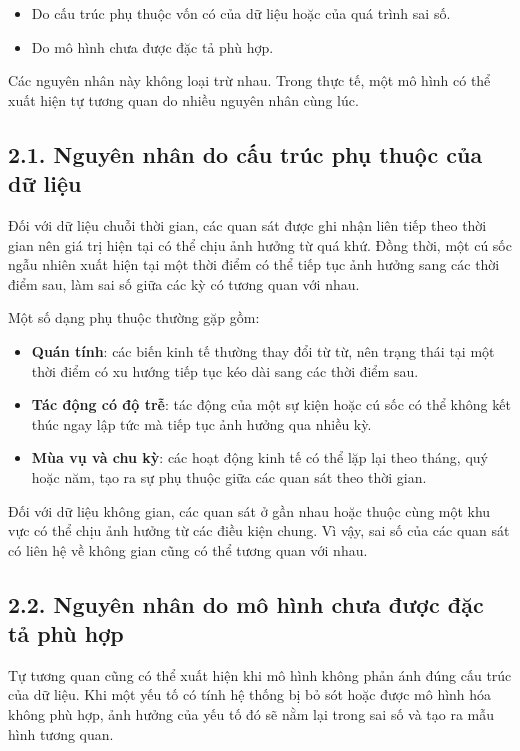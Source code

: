 \documentclass[12pt,a4paper]{article}
\begin{document}
\begin{itemize}
    \item Do cấu trúc phụ thuộc vốn có của dữ liệu hoặc của quá trình sai số.
    \item Do mô hình chưa được đặc tả phù hợp.
\end{itemize}

Các nguyên nhân này không loại trừ nhau. Trong thực tế, một mô hình có thể xuất hiện tự tương quan do nhiều nguyên nhân cùng lúc.

\subsection{2.1. Nguyên nhân do cấu trúc phụ thuộc của dữ liệu}

Đối với dữ liệu chuỗi thời gian, các quan sát được ghi nhận liên tiếp theo thời gian nên giá trị hiện tại có thể chịu ảnh hưởng từ quá khứ. Đồng thời, một cú sốc ngẫu nhiên xuất hiện tại một thời điểm có thể tiếp tục ảnh hưởng sang các thời điểm sau, làm sai số giữa các kỳ có tương quan với nhau.

Một số dạng phụ thuộc thường gặp gồm:

\begin{itemize}
    \item \textbf{Quán tính}: các biến kinh tế thường thay đổi từ từ, nên trạng thái tại một thời điểm có xu hướng tiếp tục kéo dài sang các thời điểm sau.
    
    \item \textbf{Tác động có độ trễ}: tác động của một sự kiện hoặc cú sốc có thể không kết thúc ngay lập tức mà tiếp tục ảnh hưởng qua nhiều kỳ.
    
    \item \textbf{Mùa vụ và chu kỳ}: các hoạt động kinh tế có thể lặp lại theo tháng, quý hoặc năm, tạo ra sự phụ thuộc giữa các quan sát theo thời gian.
\end{itemize}

Đối với dữ liệu không gian, các quan sát ở gần nhau hoặc thuộc cùng một khu vực có thể chịu ảnh hưởng từ các điều kiện chung. Vì vậy, sai số của các quan sát có liên hệ về không gian cũng có thể tương quan với nhau.

\subsection{2.2. Nguyên nhân do mô hình chưa được đặc tả phù hợp}

Tự tương quan cũng có thể xuất hiện khi mô hình không phản ánh đúng cấu trúc của dữ liệu. Khi một yếu tố có tính hệ thống bị bỏ sót hoặc được mô hình hóa không phù hợp, ảnh hưởng của yếu tố đó sẽ nằm lại trong sai số và tạo ra mẫu hình tương quan.
\end{document}
